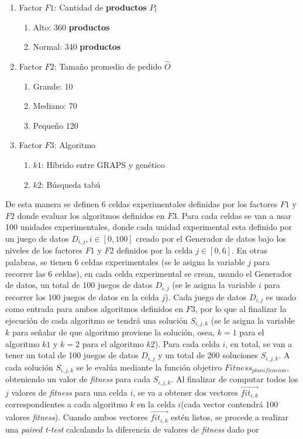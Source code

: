 \begin{enumerate}
    \item Factor $F1$: Cantidad de \textbf{productos} $P_{t}$
          \begin{enumerate}
              \item Alto: 360 \textbf{productos}
              \item Normal: 340 \textbf{productos}
          \end{enumerate}
    \item Factor $F2$: Tamaño promedio de pedido $\widehat{O}$
          \begin{enumerate}
              \item Grande: 10
              \item Mediano: 70
              \item Pequeño 120
          \end{enumerate}
    \item Factor $F3$: Algoritmo
          \begin{enumerate}
              \item $k1$: Híbrido entre GRAPS y genético
              \item $k2$: Búsqueda tabú
          \end{enumerate}
\end{enumerate}

De esta manera se definen 6 celdas experimentales definidas por los factores $F1$ y $F2$ donde evaluar los algoritmos definidos en $F3$. Para cada celdas se van a usar 100 unidades experimentales, donde cada unidad experimental esta definido por un juego de datos $D_{i,j}, i \in [0, 100]$ creado por el Generador de datos bajo los niveles de los factores $F1$ y $F2$ definidos por la celda $j \in [0, 6]$. En otras palabras, se tienen 6 celdas experimentales (se le asigna la variable $j$ para recorrer las 6 celdas), en cada celda experimental se crean, usando el Generador de datos, un total de 100 juegos de datos $D_{i,j}$ (se le asigna la variable  $i$ para recorrer los 100 juegos de datos en la celda $j$). Cada juego de datos $D_{i,j}$ es usado como entrada para ambos algoritmos definidos en $F3$, por lo que al finalizar la ejecución de cada algoritmo se tendrá una solución $S_{i,j,k}$ (se le asigna la variable $k$ para señalar de que algoritmo proviene la solución, osea, $k = 1$ para el algoritmo $k1$ y $k = 2$ para el algoritmo $k2$). Para cada celda $i$, en total, se van a tener un total de 100 juegos de datos $D_{i,j}$ y un total de 200 soluciones $S_{i,j,k}$. A cada solución $S_{i,j,k}$ se le evalúa mediante la función objetivo $Fitness_{planificacion}$, obteniendo un valor de \textit{fitness} para cada $S_{i,j,k}$. Al finalizar de computar todos los $j$ valores de \textit{fitness} para una celda $i$, se va a obtener dos vectores $\overrightarrow{fit_{i,k}}$ correspondientes a cada algoritmo $k$ en la celda $i$(cada vector contendrá 100 valores \textit{fitness}). Cuando ambos vectores $\overrightarrow{fit_{i,k}}$ estén listos, se procede a realizar una \textit{paired t-test} calculando la diferencia de valores de \textit{fitness} dado por

